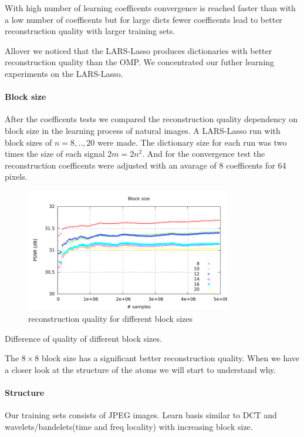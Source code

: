With high number of learning coefficents convergence is reached faster than
with a low number of coefficents but for large dicts fewer coefficents lead to
better reconstruction quality with larger training sets.

Allover we noticed that the LARS-Lasso produces dictionaries with better
reconstruction quality than the OMP. We concentrated our futher learning
experiments on the LARS-Lasso. 

\paragraph{Block size}
After the coefficents tests we compared the reconstruction quality dependency on
block size in the learning process of natural images. A LARS-Lasso run with
block sizes of $n=8,..,20$ were made. The dictionary size for each run was two
times the size of each signal $2m=2n^2$. And for the convergence test the
reconstruction coefficents were adjusted with an avarage of 8 coefficents for 64
pixels.

\begin{figure}[h]
\centering
\includegraphics[width =
0.8\textwidth]{../tests/results/blockSizeConverg.pdf}
\caption{reconstruction quality for different block sizes}
\label{fig:dict size}
\end{figure}

Difference of quality of different block sizes.

The $8\times8$ block size has a significant better reconstruction quality. 
When we have a closer look at the structure of the atoms we will start to
understand why.

\paragraph{Structure}
Our training sets consists of JPEG images. 
Learn basis similar to DCT and wavelets/bandelets(time and freq locality) with
increasing block size.


